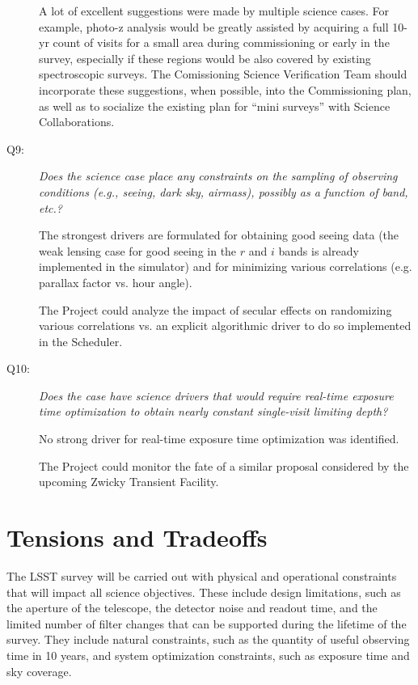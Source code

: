 \begin{description}
A lot of excellent suggestions were made by multiple science cases.
For example, photo-z analysis would be greatly assisted by acquiring
a full 10-yr count of visits for a small area during commissioning or
early in the survey, especially if these regions would be also covered by
existing spectroscopic surveys.
The Comissioning Science Verification Team should incorporate these
suggestions, when possible, into the Commissioning plan, as well
as to socialize the existing plan for ``mini surveys'' with Science
Collaborations.


\item[Q9:] {\it Does the science case place any constraints on the
sampling of observing conditions (e.g., seeing, dark sky, airmass),
possibly as a function of band, etc.?}

The strongest drivers are formulated for obtaining good seeing data (the
weak lensing case for good seeing in the $r$ and $i$ bands is already
implemented in the simulator) and for minimizing various correlations
(e.g. parallax factor vs. hour angle).

The Project could analyze the impact of secular effects on randomizing
various correlations vs. an explicit algorithmic driver to do so
implemented in the Scheduler.


\item[Q10:] {\it Does the case have science drivers that would require
real-time exposure time optimization to obtain nearly constant
single-visit limiting depth?}

No strong driver for real-time exposure time optimization was
identified.

The Project could monitor the fate of a similar proposal considered by
the upcoming Zwicky Transient Facility.

\end{description}

\navigationbar


\section{Tensions and Tradeoffs}


The LSST survey will be carried out with physical and operational
constraints that will impact all science objectives.  These include
design limitations, such as the aperture of the telescope, the detector
noise and readout time, and the limited number of filter changes that
can be supported during the lifetime of the survey.  They include
natural constraints, such as the quantity of useful observing time
in 10 years, and system optimization constraints, such as
exposure time and sky coverage.

